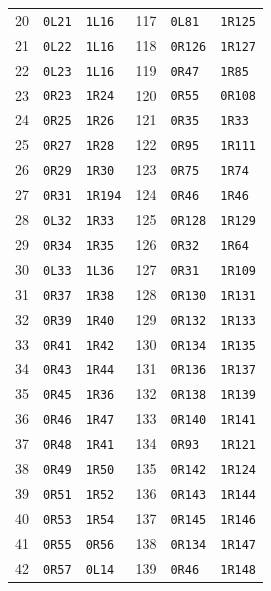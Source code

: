 \begin{longtable}{@{}rll@{\hspace{1.6cm}}rll@{}}
20 & \texttt{0L21} & \texttt{1L16} & 117 & \texttt{0L81} & \texttt{1R125} \\
21 & \texttt{0L22} & \texttt{1L16} & 118 & \texttt{0R126} & \texttt{1R127} \\
22 & \texttt{0L23} & \texttt{1L16} & 119 & \texttt{0R47} & \texttt{1R85} \\
23 & \texttt{0R23} & \texttt{1R24} & 120 & \texttt{0R55} & \texttt{0R108} \\
24 & \texttt{0R25} & \texttt{1R26} & 121 & \texttt{0R35} & \texttt{1R33} \\
25 & \texttt{0R27} & \texttt{1R28} & 122 & \texttt{0R95} & \texttt{1R111} \\
26 & \texttt{0R29} & \texttt{1R30} & 123 & \texttt{0R75} & \texttt{1R74} \\
27 & \texttt{0R31} & \texttt{1R194} & 124 & \texttt{0R46} & \texttt{1R46} \\
28 & \texttt{0L32} & \texttt{1R33} & 125 & \texttt{0R128} & \texttt{1R129} \\
29 & \texttt{0R34} & \texttt{1R35} & 126 & \texttt{0R32} & \texttt{1R64} \\
30 & \texttt{0L33} & \texttt{1L36} & 127 & \texttt{0R31} & \texttt{1R109} \\
31 & \texttt{0R37} & \texttt{1R38} & 128 & \texttt{0R130} & \texttt{1R131} \\
32 & \texttt{0R39} & \texttt{1R40} & 129 & \texttt{0R132} & \texttt{1R133} \\
33 & \texttt{0R41} & \texttt{1R42} & 130 & \texttt{0R134} & \texttt{1R135} \\
34 & \texttt{0R43} & \texttt{1R44} & 131 & \texttt{0R136} & \texttt{1R137} \\
35 & \texttt{0R45} & \texttt{1R36} & 132 & \texttt{0R138} & \texttt{1R139} \\
36 & \texttt{0R46} & \texttt{1R47} & 133 & \texttt{0R140} & \texttt{1R141} \\
37 & \texttt{0R48} & \texttt{1R41} & 134 & \texttt{0R93} & \texttt{1R121} \\
38 & \texttt{0R49} & \texttt{1R50} & 135 & \texttt{0R142} & \texttt{1R124} \\
39 & \texttt{0R51} & \texttt{1R52} & 136 & \texttt{0R143} & \texttt{1R144} \\
40 & \texttt{0R53} & \texttt{1R54} & 137 & \texttt{0R145} & \texttt{1R146} \\
41 & \texttt{0R55} & \texttt{0R56} & 138 & \texttt{0R134} & \texttt{1R147} \\
42 & \texttt{0R57} & \texttt{0L14} & 139 & \texttt{0R46} & \texttt{1R148} \\

\end{longtable}
